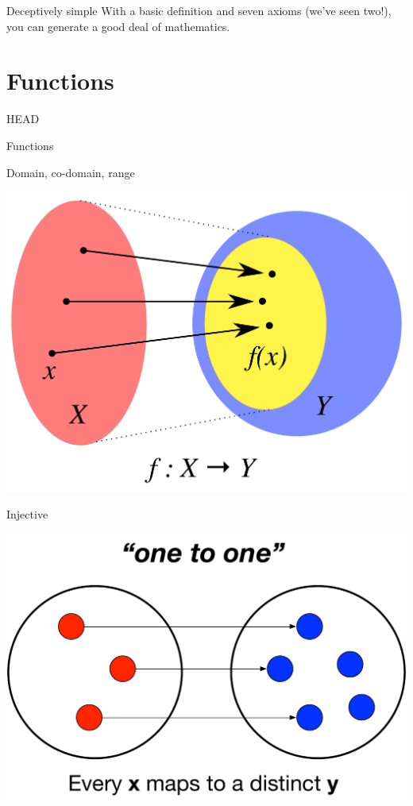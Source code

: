 \documentclass[utf8x,notes,17pt]{beamer}
\newcommand{\head}[1]{\begin{center}
\vspace{13mm}\hspace{-1mm}\Huge{{#1}}
\end{center}}
\begin{document}
\begin{frame}[fragile,label=sec-3-9]{Deceptively simple}
With a basic definition and seven axioms (we've seen two!), you can generate a
good deal of mathematics.
\end{frame}
\section{Functions}
\label{sec-4}
\begin{frame}[fragile,plain,label=sec-4-1]{HEAD}
\head{Functions}
\end{frame}
\begin{frame}[fragile,label=sec-4-2]{Domain, co-domain, range}
\begin{center}
\includegraphics[width=.9\linewidth]{images/Codomain2.pdf}
\end{center}
\end{frame}
\begin{frame}[fragile,label=sec-4-3]{Injective}
\begin{center}
\includegraphics[width=.9\linewidth]{images/Mappings1.pdf}
\end{center}
\end{frame}
\end{document}
